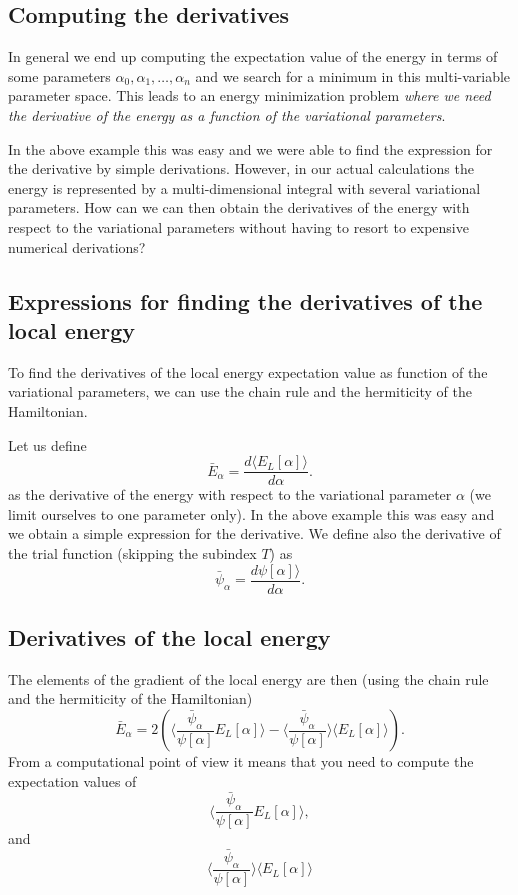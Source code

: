 \documentclass[%
oneside,                 %
final,                   %
10pt]{article}
\begin{document}
\subsection*{Computing the derivatives}

In general we end up computing the expectation value of the energy in terms 
of some parameters $\alpha_0,\alpha_1,\dots,\alpha_n$
and we search for a minimum in this multi-variable parameter space.  
This leads to an energy minimization problem \emph{where we need the derivative of the energy as a function of the variational parameters}.

In the above example this was easy and we were able to find the expression for the derivative by simple derivations. 
However, in our actual calculations the energy is represented by a multi-dimensional integral with several variational parameters.
How can we can then obtain the derivatives of the energy with respect to the variational parameters without having 
to resort to expensive numerical derivations? 

\subsection*{Expressions for finding the derivatives of the local energy}

To find the derivatives of the local energy expectation value as function of the variational parameters, we can use the chain rule and the hermiticity of the Hamiltonian.  

Let us define 
\[
\bar{E}_{\alpha}=\frac{d\langle  E_L[\alpha]\rangle}{d\alpha}.
\]
as the derivative of the energy with respect to the variational parameter $\alpha$ (we limit ourselves to one parameter only).
In the above example this was easy and we obtain a simple expression for the derivative.
We define also the derivative of the trial function (skipping the subindex $T$) as 
\[
\bar{\psi}_{\alpha}=\frac{d\psi[\alpha]\rangle}{d\alpha}.
\]

\subsection*{Derivatives of the local energy}

The elements of the gradient of the local energy are then (using the chain rule and the hermiticity of the Hamiltonian)
\[
\bar{E}_{\alpha} = 2\left( \langle \frac{\bar{\psi}_{\alpha}}{\psi[\alpha]}E_L[\alpha]\rangle -\langle \frac{\bar{\psi}_{\alpha}}{\psi[\alpha]}\rangle\langle E_L[\alpha] \rangle\right).
\]
From a computational point of view it means that you need to compute the expectation values of 
\[
\langle \frac{\bar{\psi}_{\alpha}}{\psi[\alpha]}E_L[\alpha]\rangle,
\]
and
\[
\langle \frac{\bar{\psi}_{\alpha}}{\psi[\alpha]}\rangle\langle E_L[\alpha]\rangle
\]
\end{document}
